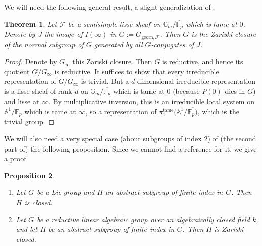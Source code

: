 \documentclass[11pt]{amsart}
\theoremstyle{plain}
\newtheorem{thm}{Theorem}
\newtheorem{prop}[thm]{Proposition}
\theoremstyle{definition}
\numberwithin{thm}{section}
\numberwithin{equation}{thm}
\newcommand{\sF}{{\mathcal F}}
\newcommand{\A}{{\mathbb A}}
\newcommand{\F}{{\mathbb F}}
\newcommand{\G}{{\mathbb G}}
\newcommand{\0}{\emptyset}
\newcommand{\geo}{{\mathrm {geom}}}
\begin{document}
We will need the following general result, a slight generalization of \cite[Theorem 4.6]{KT5}.

\begin{thm}\label{Iinftygen}Let $\sF$ be a semisimple lisse sheaf on $\G_m/\overline{\F_p}$ which is tame at $0$. Denote by $J$  the image of $I(\infty)$ in $G:=G_{\geo,\sF}$. Then $G$ is the Zariski closure of the normal subgroup of $G$ generated by all $G$-conjugates of $J$.
\end{thm}

\begin{proof}Denote by $G_\infty$ this Zariski closure. Then $G$ is reductive, and hence its quotient $G/G_\infty$ is reductive. It suffices to show that every irreducible representation of $G/G_\infty$ is trivial. But a $d$-dimensional irreducible representation is a lisse sheaf of rank $d$ on 
$\G_m/\overline{\F_p}$ which is tame at $0$ (because $P(0)$ dies in $G$) and lisse at $\infty$. By multiplicative inversion, this is an irreducible local system
on $\A^1/\overline{\F_p}$ which is tame at $\infty$, so a representation of $\pi_1^{{\mathrm{tame}}}(\A^1/\overline{\F_p)}$, which is the trivial group.
\end{proof}

We will also need a very special case (about subgroups of index $2$) of (the second part of) the following proposition. 
Since we cannot find a reference for it, we give a proof.

\begin{prop}\label{finite-index}
\begin{enumerate}[\rm(i)]
\item Let $G$ be a Lie group and $H$ an abstract subgroup of finite index in $G$. Then $H$ is closed. 
\item Let $G$ be a reductive linear algebraic group over an algebraically closed field $k$, 
and let $H$ be an abstract subgroup of finite index in 
$G$. Then $H$ is Zariski closed.
\end{enumerate}
\end{prop}
\end{document}
